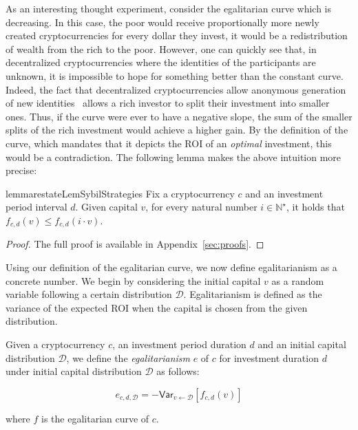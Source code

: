 As an interesting thought experiment, consider the egalitarian curve which is
decreasing. In this case, the poor would receive proportionally more newly
created cryptocurrencies for every dollar they invest, \ie it would be a
redistribution of wealth from the rich to the poor. However, one
can quickly see that, in decentralized cryptocurrencies where the identities of
the participants are unknown, it is impossible to
hope for something better than the constant curve. Indeed, the fact that
decentralized cryptocurrencies allow anonymous generation of new
identities~\cite{douceur2002sybil}
allows a rich investor to split their investment into smaller ones.  Thus, if
the curve were ever to have a negative slope, the sum of the smaller splits of
the rich investment would achieve a higher gain. By the definition of the
curve, which mandates that it depicts the ROI of an \emph{optimal} investment,
this would be a contradiction. The following lemma makes the above intuition
more precise:

\begin{restatable}{lemma}{restateLemSybilStrategies}
\label{lem:sybil}
    Fix a cryptocurrency $c$ and an investment period interval $d$. Given capital $v$,
    for every natural number $i \in \mathbb{N}^\star$, it
    holds that $f_{c,d}(v) \leq f_{c,d}(i \cdot v)$.
\end{restatable}
\begin{proof}
    The full proof is available in Appendix~\ref{sec:proofs}.
\end{proof}

Using our definition of the egalitarian curve, we now define egalitarianism as
a concrete number. We begin by considering the initial capital $v$ as a random
variable following a certain distribution $\mathcal{D}$. Egalitarianism is
defined as the variance of the expected ROI when the capital is chosen from the
given distribution.

\begin{definition}[Egalitarianism]
  Given a cryptocurrency $c$, an investment period duration $d$ and an initial
  capital distribution $\mathcal{D}$, we define the \emph{egalitarianism} $e$ of $c$
  for investment duration $d$ under initial capital distribution $\mathcal{D}$
  as follows:

  \[
    e_{c,d,\mathcal{D}} = -\textsf{Var}_{v \gets \mathcal{D}}[f_{c,d}(v)]
  \]

  where $f$ is the egalitarian curve of $c$.
\end{definition}

